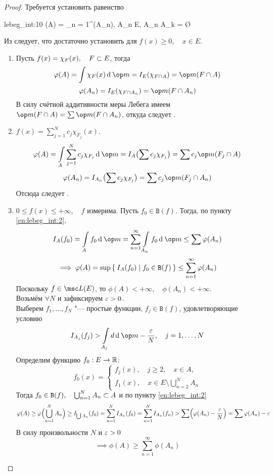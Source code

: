 \begin{proof}
	Требуется установить равенство
	\begin{equ}{lebeg_int:10}
		\phi(A) = \sum_{n = 1}^\infty \phi(A_n), \quad {} A_n \sub E, \quad A_n \cap A_k = \O
	\end{equ}

	Из  следует, что достаточно установить  для $ f(x) \ge 0, \quad x \in E $.
	\begin{enumerate}
		\item Пусть $ f(x) = \chi_F(x), \quad F \subset E $, тогда
			$$ \phi(A) = \int\limits \chi_F(x) \di \op m = I_E(\chi_{F \cap A}) = \op m (F \cap A) $$
			$$ \phi(A_n) = I_E(\chi_{F \cap A_n}) = \op m (F \cap A_n) $$
			В силу счётной аддитивности меры Лебега имеем $ \op m(F \cap A) = \sum \op m(F \cap A_n) $, откуда следует .

		\item \label{en:lebeg_int:2} $ f(x) = \sum_{j = 1}^N c_j \chi_{F_j}(x) $.
			$$ \phi(A) = \int\limits_A \sum_{j = 1}^N c_j \chi_{F_j} \di \op m = I_A \bigl( \sum c_j \chi_{F_j} \bigr) = \sum c_j \op m(F_j \cap A) $$
			$$ \phi(A_n) = I_{A_n} \bigl( \sum c_j \chi_{F_j} \bigr) = \sum c_j \op m (F_j \cap A_n) $$
			Отсюда следует .

		\item $ 0 \le f(x) \le +\infty, \quad f $ измерима. Пусть $ f_0 \in \mathtt B(f) $. Тогда, по пункту \ref{en:lebeg_int:2},
			$$ I_A(f_0) = \int\limits_A f_0 \di \op m = \sum_{n = 1}^\infty \int\limits_{A_n} f_0 \di \op m \le \sum \phi(A_n) $$
			$$ \implies \varphi(A) = \sup \Set{I_A(f_0) \mid f_0 \in \mathtt B(f)} \le \sum_{n = 1}^\infty \varphi(A_n) $$
			Поскольку $ f \in \msc L(E) $, то $ \phi(A) < +\infty, \quad \phi(A_n) < +\infty $. \\
			Возьмём $ \forall N $ и зафиксируем $ \varepsilon > 0 $. \\
			Выберем $ f_1, \dots, f_N $ "--- простые функции, $ f_j \in \mathtt B(f) $, удовлетворяющие условию
			$$ I_{A_j}(f_j) > \int\limits_{A_j} d \di \op m - \frac\eps N, \quad j = 1, \dots, N $$
			Определим функцию $ f_0 : E \to \mathbb{R} $:
			$$ f_0(x) =
			\begin{cases}
				f_j(x), \quad j \ge 2, \quad x \in A, \\
				f_1(x), \quad x \in E \setminus \bigcup_{n = 2}^N A_n
			\end{cases} $$
			Тогда $ f_0 \in \mathtt B(f), \quad \bigcup_{n = 1}^N A_n \subset A $ и по пункту \ref{en:lebeg_int:2}
			$$ \varphi(A) \ge \varphi \Bigl( \bigcup_{n = 1}^N A_n \Bigr) \ge I_{\bigcup A_n} (f_0) = \sum_{n = 1}^N I_{A_n} (f_0) = \sum_{n = 1}^N I_{A_n}(f_n) > \sum \Bigl( \varphi(A_n) - \frac{\varepsilon} N \Bigr) = \sum \varphi(A_n) - \varepsilon $$
			В силу произвольности $ N $ и $ \varepsilon > 0 $
			$$ \implies \phi(A) \ge \sum_{n = 1}^\infty \phi(A_n) $$
	\end{enumerate}
\end{proof}

